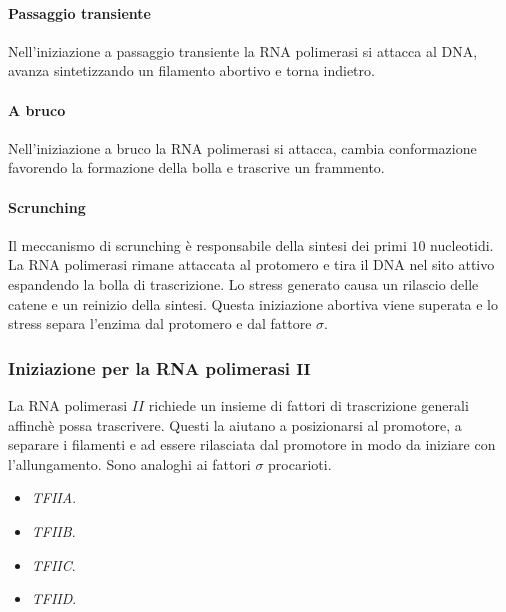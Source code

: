 			\paragraph{Passaggio transiente}
			Nell'iniziazione a passaggio transiente la RNA polimerasi si attacca al DNA, avanza sintetizzando un filamento abortivo e torna indietro.

			\paragraph{A bruco}
			Nell'iniziazione a bruco la RNA polimerasi si attacca, cambia conformazione favorendo la formazione della bolla e trascrive un frammento.

			\paragraph{Scrunching}
			Il meccanismo di scrunching \`e responsabile della sintesi dei primi $10$ nucleotidi.
			La RNA polimerasi rimane attaccata al protomero e tira il DNA nel sito attivo espandendo la bolla di trascrizione.
			Lo stress generato causa un rilascio delle catene e un reinizio della sintesi.
			Questa iniziazione abortiva viene superata e lo stress separa l'enzima dal protomero e dal fattore $\sigma$.

		\subsubsection{Iniziazione per la RNA polimerasi $\mathbf{II}$}
		La RNA polimerasi $II$ richiede un insieme di fattori di trascrizione generali affinch\`e possa trascrivere.
		Questi la aiutano a posizionarsi al promotore, a separare i filamenti e ad essere rilasciata dal promotore in modo da iniziare con l'allungamento.
		Sono analoghi ai fattori $\sigma$ procarioti.
		\begin{multicols}{4}
			\begin{itemize}
				\item \emph{TFIIA}.
				\item \emph{TFIIB}.
				\item \emph{TFIIC}.
				\item \emph{TFIID}.
			\end{itemize}
		\end{multicols}

